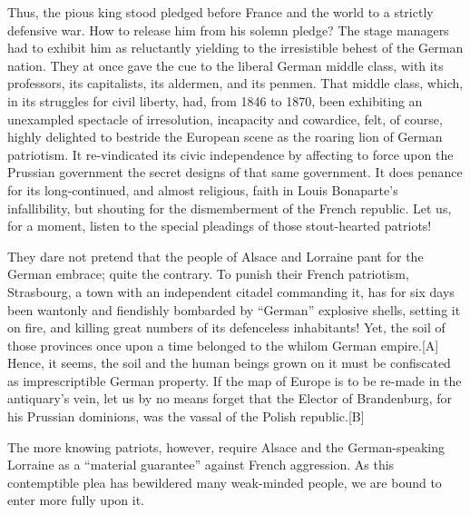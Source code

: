 \documentclass{article}
\begin{document}
Thus, the pious king stood pledged before France and the world to
a strictly defensive war. How to release him from his solemn pledge? The
stage managers had to exhibit him as reluctantly yielding to the
irresistible behest of the German nation. They at once gave the cue to the
liberal German middle class, with its professors, its capitalists, its
aldermen, and its penmen. That middle class, which, in its struggles for
civil liberty, had, from 1846 to 1870, been exhibiting an unexampled
spectacle of irresolution, incapacity and cowardice, felt, of course,
highly delighted to bestride the European scene as the roaring lion of
German patriotism. It re-vindicated its civic independence by affecting to
force upon the Prussian government the secret designs of that same
government. It does penance for its long-continued, and almost religious,
faith in Louis Bonaparte’s infallibility, but shouting for the
dismemberment of the French republic. Let us, for a moment, listen to the
special pleadings of those stout-hearted patriots!

They dare not pretend that the people of Alsace and Lorraine pant for the
German embrace; quite the contrary. To punish their French patriotism,
Strasbourg, a town with an independent citadel commanding it, has for six
days been wantonly and fiendishly bombarded by “German” explosive shells,
setting it on fire, and killing great numbers of its defenceless
inhabitants! Yet, the soil of those provinces once upon a time belonged to
the whilom German empire.[A] Hence, it seems, the soil and the human
beings grown on it must be confiscated as imprescriptible German property.
If the map of Europe is to be re-made in the antiquary’s vein, let us by
no means forget that the Elector of Brandenburg, for his Prussian
dominions, was the vassal of the Polish republic.[B]

The more knowing patriots, however, require Alsace and the German-speaking
Lorraine as a “material guarantee” against French aggression. As this
contemptible plea has bewildered many weak-minded people, we are bound to
enter more fully upon it.
\end{document}
